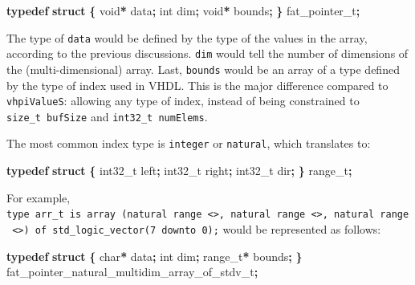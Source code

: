 \documentclass[
]{article}
\newenvironment{Shaded}{\begin{snugshade}}{\end{snugshade}}
\newcommand{\DataTypeTok}[1]{\textcolor[rgb]{0.13,0.29,0.53}{#1}}
\newcommand{\KeywordTok}[1]{\textcolor[rgb]{0.13,0.29,0.53}{\textbf{#1}}}
\newcommand{\NormalTok}[1]{#1}
\newcommand{\OperatorTok}[1]{\textcolor[rgb]{0.81,0.36,0.00}{\textbf{#1}}}
\begin{document}
\begin{Shaded}
\begin{Highlighting}[]
\KeywordTok{typedef} \KeywordTok{struct} \OperatorTok{\{}
  \DataTypeTok{void}\OperatorTok{*}\NormalTok{ data}\OperatorTok{;}
  \DataTypeTok{int}\NormalTok{ dim}\OperatorTok{;}
  \DataTypeTok{void}\OperatorTok{*}\NormalTok{ bounds}\OperatorTok{;}
\OperatorTok{\}}\NormalTok{ fat\_pointer\_t}\OperatorTok{;}
\end{Highlighting}
\end{Shaded}

The type of \texttt{data} would be defined by the type of the values in the array, according to the previous discussions. \texttt{dim} would tell the number of dimensions of the (multi-dimensional) array. Last, \texttt{bounds} would be an array of a type defined by the type of index used in VHDL. This is the major difference compared to \texttt{vhpiValueS}: allowing any type of index, instead of being constrained to \texttt{size\_t\ bufSize} and \texttt{int32\_t\ numElems}.

The most common index type is \texttt{integer} or \texttt{natural}, which translates to:

\begin{Shaded}
\begin{Highlighting}[]
\KeywordTok{typedef} \KeywordTok{struct} \OperatorTok{\{}
  \DataTypeTok{int32\_t}\NormalTok{ left}\OperatorTok{;}
  \DataTypeTok{int32\_t}\NormalTok{ right}\OperatorTok{;}
  \DataTypeTok{int32\_t}\NormalTok{ dir}\OperatorTok{;}
\OperatorTok{\}}\NormalTok{ range\_t}\OperatorTok{;}
\end{Highlighting}
\end{Shaded}

For example, \texttt{type\ arr\_t\ is\ array\ (natural\ range\ \textless{}\textgreater{},\ natural\ range\ \textless{}\textgreater{},\ natural\ range\ \textless{}\textgreater{})\ of\ std\_logic\_vector(7\ downto\ 0);} would be represented as follows:

\begin{Shaded}
\begin{Highlighting}[]
\KeywordTok{typedef} \KeywordTok{struct} \OperatorTok{\{}
  \DataTypeTok{char}\OperatorTok{*}\NormalTok{ data}\OperatorTok{;}
  \DataTypeTok{int}\NormalTok{ dim}\OperatorTok{;}
\NormalTok{  range\_t}\OperatorTok{*}\NormalTok{ bounds}\OperatorTok{;}
\OperatorTok{\}}\NormalTok{ fat\_pointer\_natural\_multidim\_array\_of\_stdv\_t}\OperatorTok{;}
\end{Highlighting}
\end{Shaded}
\end{document}
